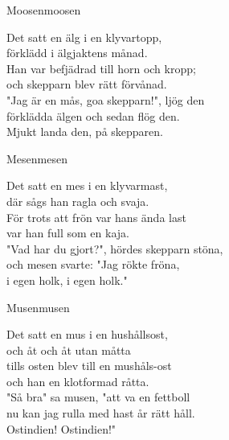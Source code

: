 \begin{song}{Moosen}{moosen}
\begin{vers}
Det satt en älg i en klyvartopp,\\
förklädd i älgjaktens månad.\\
Han var befjädrad till horn och kropp;\\
och skepparn blev rätt förvånad.\\
"Jag är en mås, goa skepparn!", ljög den\\
förklädda älgen och sedan flög den.\\
Mjukt landa den,
på skepparen.\\
\end{vers}
\end{song}

\begin{song}{Mesen}{mesen}
\begin{vers}
Det satt en mes i en klyvarmast,\\
där sågs han ragla och svaja.\\
För trots att frön var hans ända last\\
var han full som en kaja.\\
"Vad har du gjort?", hördes skepparn stöna,\\
och mesen svarte: "Jag rökte fröna,\\
i egen holk, i egen holk."\\
\end{vers}
\end{song}

\begin{song}{Musen}{musen}
\begin{vers}
Det satt en mus i en hushållsost,\\
och åt och åt utan måtta\\
tills osten blev till en mushåls-ost\\
och han en klotformad råtta.\\
"Så bra" sa musen, "att va en fettboll\\
nu kan jag rulla med hast år rätt håll.\\
Ostindien! Ostindien!"\\
\end{vers}
\end{song}

\newpage

